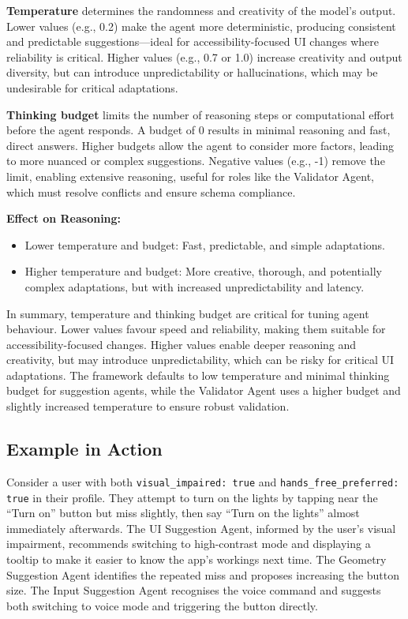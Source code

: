 \documentclass[openany]{book}
\begin{document}
\textbf{Temperature} determines the randomness and creativity of the model’s output. Lower values (e.g., 0.2) make the agent more deterministic, producing consistent and predictable suggestions—ideal for accessibility-focused UI changes where reliability is critical. Higher values (e.g., 0.7 or 1.0) increase creativity and output diversity, but can introduce unpredictability or hallucinations, which may be undesirable for critical adaptations.

\textbf{Thinking budget} limits the number of reasoning steps or computational effort before the agent responds. A budget of 0 results in minimal reasoning and fast, direct answers. Higher budgets allow the agent to consider more factors, leading to more nuanced or complex suggestions. Negative values (e.g., -1) remove the limit, enabling extensive reasoning, useful for roles like the Validator Agent, which must resolve conflicts and ensure schema compliance.

\textbf{Effect on Reasoning:}
\begin{itemize}
    \item Lower temperature and budget: Fast, predictable, and simple adaptations.
    \item Higher temperature and budget: More creative, thorough, and potentially complex adaptations, but with increased unpredictability and latency.
\end{itemize}

In summary, temperature and thinking budget are critical for tuning agent behaviour. Lower values favour speed and reliability, making them suitable for accessibility-focused changes. Higher values enable deeper reasoning and creativity, but may introduce unpredictability, which can be risky for critical UI adaptations. The framework defaults to low temperature and minimal thinking budget for suggestion agents, while the Validator Agent uses a higher budget and slightly increased temperature to ensure robust validation.

\subsection{Example in Action}
Consider a user with both \texttt{visual\_impaired: true} and \texttt{hands\_free\_preferred: true} in their profile. They attempt to turn on the lights by tapping near the “Turn on” button but miss slightly, then say “Turn on the lights” almost immediately afterwards. The UI Suggestion Agent, informed by the user’s visual impairment, recommends switching to high-contrast mode and displaying a tooltip to make it easier to know the app's workings next time. The Geometry Suggestion Agent identifies the repeated miss and proposes increasing the button size. The Input Suggestion Agent recognises the voice command and suggests both switching to voice mode and triggering the button directly.
\end{document}
